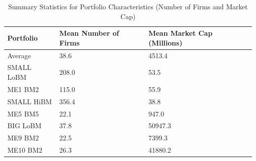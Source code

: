 \begin{table}
\caption{Summary Statistics for Portfolio Characteristics (Number of Firms and Market Cap)}
\label{tab:summary_stats_characteristics}
\begin{tabular}{lll}
\toprule
Portfolio & Mean Number of Firms & Mean Market Cap (Millions) \\
\midrule
Average & 38.6 & 4513.4 \\
SMALL LoBM & 208.0 & 53.5 \\
ME1 BM2 & 115.0 & 55.9 \\
SMALL HiBM & 356.4 & 38.8 \\
ME5 BM5 & 22.1 & 947.0 \\
BIG LoBM & 37.8 & 50947.3 \\
ME9 BM2 & 22.5 & 7399.3 \\
ME10 BM2 & 26.3 & 41880.2 \\
\bottomrule
\end{tabular}
\end{table}
